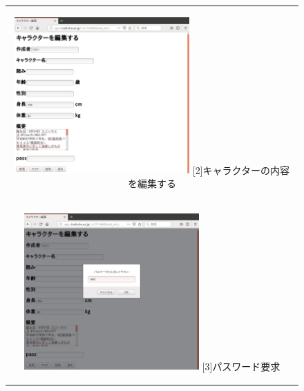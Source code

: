 \documentclass[12pt,a4paper]{jarticle}
\begin{document}
\begin{ttfamily}
\begin{figure}[htbp]
\begin{center}
\begin{tabular}{c}
      \begin{minipage}{0.55\hsize}
        \begin{center}
          \includegraphics[width=6.7cm]{10-3-26.eps}
          \hspace{1.6cm} [2]キャラクターの内容を編集する
        \end{center}
      \end{minipage}

      \begin{minipage}{0.55\hsize}
        \vspace{30mm}
      \end{minipage} \\
 
      \begin{minipage}{0.5\hsize}
        \begin{center}
          \includegraphics[width=6.7cm]{10-3-27.eps}
          \hspace{1.6cm} [3]パスワード要求
        \end{center}
      \end{minipage}


\end{tabular}
\end{center}
\end{figure}
\end{ttfamily}
\end{document}
